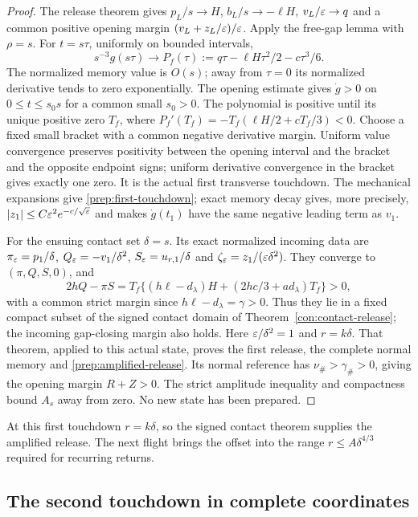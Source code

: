\begin{proof}
The release theorem gives $p_L/s\to H$, $b_L/s\to-\ell H$,
$v_L/\varepsilon\to q$ and a common positive opening margin
$(v_L+z_L/\varepsilon)/\varepsilon$. Apply the free-gap lemma with $\rho=s$.
For $t=s\tau$, uniformly on bounded intervals,
\[
 s^{-3}g(s\tau)\longrightarrow
 P_f(\tau):=q\tau-\ell H\tau^2/2-c\tau^3/6.
\]
The normalized memory value is $O(s)$; away from $\tau=0$ its
normalized derivative tends to zero exponentially. The opening
estimate gives $\dot g>0$ on $0\le t\le s_0s$ for a common small
$s_0>0$. The polynomial is positive until its unique positive zero
$T_f$, where $P_f'(T_f)=-T_f(\ell H/2+cT_f/3)<0$.
Choose a fixed small bracket with a common negative derivative
margin. Uniform value convergence preserves positivity between the
opening interval and the bracket and the opposite endpoint signs;
uniform derivative convergence in the bracket gives exactly one zero.
It is the actual first transverse touchdown. The mechanical expansions
give \eqref{prep:first-touchdown}; exact memory decay gives, more
precisely, $|z_1|\le C\varepsilon^2e^{-c/\sqrt{\varepsilon}}$ and makes
$\dot g(t_1)$ have the same negative leading term as $v_1$.

For the ensuing contact set $\delta=s$. Its exact normalized incoming
data are $\pi_\varepsilon=p_1/\delta$, $Q_\varepsilon=-v_1/\delta^2$,
$S_\varepsilon=u_{r,1}/\delta$ and
$\zeta_\varepsilon=z_1/(\varepsilon\delta^2)$.
They converge to $(\pi,Q,S,0)$, and
\[
 2hQ-\pi S
 =T_f\{(h\ell-d_\lambda)H+(2hc/3+ad_\lambda)T_f\}>0,
\]
with a common strict margin since $h\ell-d_\lambda=\gamma>0$.
Thus they lie in a fixed compact subset of the signed contact domain
of Theorem~\ref{con:contact-release}; the incoming gap-closing margin
also holds. Here $\varepsilon/\delta^2=1$ and $r=k\delta$.
That theorem, applied to this actual state, proves the first release,
the complete normal memory and \eqref{prep:amplified-release}.
Its normal reference has $\nu_\#>\gamma_\#>0$, giving the
opening margin $R+Z>0$. The strict amplitude inequality and compactness
bound $A_s$ away from zero. No new state has been prepared.
\end{proof}

At this first touchdown $r=k\delta$, so the signed contact theorem
supplies the amplified release. The next flight brings the offset
into the range $r\le A\delta^{4/3}$ required for recurring returns.

\subsection{The second touchdown in complete coordinates}

